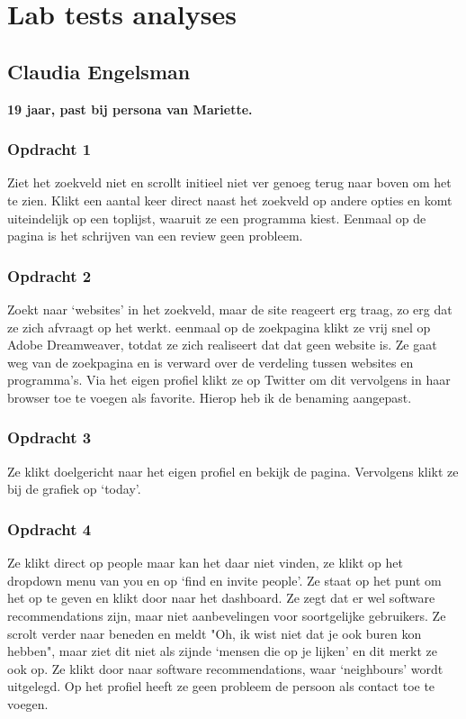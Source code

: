 \chapter{Lab tests analyses}
    \label{labtestsappendix}

\section{Claudia Engelsman}
\textbf{19 jaar, past bij persona van Mariette.}

\subsection{Opdracht 1}
  Ziet het zoekveld niet en scrollt initieel niet ver genoeg terug naar boven om het te zien. Klikt een aantal keer direct naast het zoekveld op andere opties en komt uiteindelijk op een toplijst, waaruit ze een programma kiest. Eenmaal op de pagina is het schrijven van een review geen probleem.

\subsection{Opdracht 2}
  Zoekt naar `websites' in het zoekveld, maar de site reageert erg traag, zo erg dat ze zich afvraagt op het werkt. eenmaal op de zoekpagina klikt ze vrij snel op Adobe Dreamweaver, totdat ze zich realiseert dat dat geen website is. Ze gaat weg van de zoekpagina en is verward over de verdeling tussen websites en programma's. Via het eigen profiel klikt ze op Twitter om dit vervolgens in haar browser toe te voegen als favorite. Hierop heb ik de benaming aangepast.

\subsection{Opdracht 3}
  Ze klikt doelgericht naar het eigen profiel en bekijk de pagina. Vervolgens klikt ze bij de grafiek op `today'.

\subsection{Opdracht 4}
 Ze klikt direct op people maar kan het daar niet vinden, ze klikt op het dropdown menu van you en op `find en invite people'. Ze staat op het punt om het op te geven en klikt door naar het dashboard. Ze zegt dat er wel software recommendations zijn, maar niet aanbevelingen voor soortgelijke gebruikers. Ze scrolt verder naar beneden en meldt "Oh, ik wist niet dat je ook buren kon hebben", maar ziet dit niet als zijnde `mensen die op je lijken' en dit merkt ze ook op. Ze klikt door naar software recommendations, waar `neighbours' wordt uitgelegd. Op het profiel heeft ze geen probleem de persoon als contact toe te voegen.

